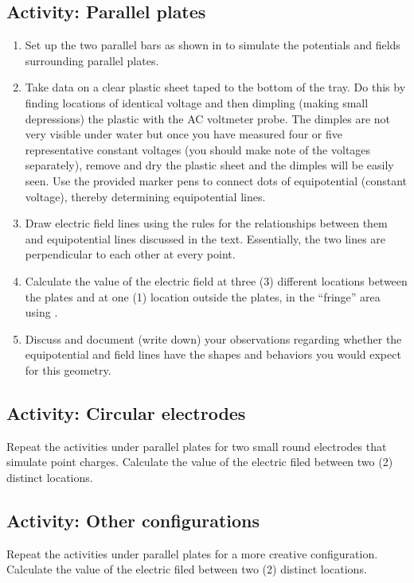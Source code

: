 \begin{multicols}{2}
\subsection{Activity: Parallel plates} %
\begin{enumerate}
	 \item Set up the two parallel bars as shown in  to simulate the potentials and fields surrounding parallel plates.
	 \item  Take data on a clear plastic sheet taped to the bottom of the tray.  Do this by finding locations of identical voltage and then dimpling (making small depressions) the plastic with the AC voltmeter probe.  
	 The dimples are not very visible under water but once you have measured four or five representative constant voltages (you should make note of the voltages separately), remove and dry the plastic sheet and the dimples will be easily seen.  
	 Use the provided marker pens to connect dots of equipotential (constant voltage), thereby determining equipotential lines.
	  \item Draw electric field lines using the rules for the relationships between them and equipotential lines discussed in the text. Essentially, the two lines are perpendicular to each other at every point.
	 \item Calculate the value of the electric field at three (3) different locations between the plates and at one (1) location outside the plates, in the ``fringe'' area using .
	\item Discuss and document (write down) your observations regarding whether the equipotential and field lines have the shapes and behaviors you would expect for this geometry.
\end{enumerate}

\subsection{Activity: Circular electrodes}
Repeat the activities under parallel plates for two small round electrodes that simulate point charges. Calculate the value of the electric filed between two (2) distinct locations.

\subsection{Activity: Other configurations}
Repeat the activities under parallel plates for a more creative configuration. Calculate the value of the electric filed between two (2) distinct locations.
\end{multicols}

